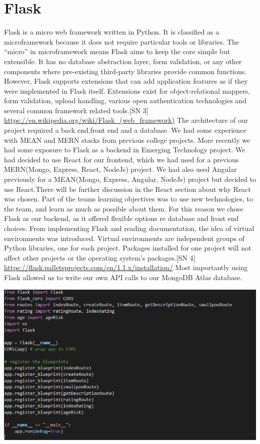\section{Flask}
Flask is a micro web framework written in Python. It is classified as a microframework because it does not require particular tools or libraries. The “micro” in microframework means Flask aims to keep the core simple but extensible. It has no database abstraction layer, form validation, or any other components where pre-existing third-party libraries provide common functions. However, Flask supports extensions that can add application features as if they were implemented in Flask itself. Extensions exist for object-relational mappers, form validation, upload handling, various open authentication technologies and several common framework related tools.[SN 3] \url{https://en.wikipedia.org/wiki/Flask_(web_framework)}
The architecture of our project required a back end,front end and a database. We had some experience with MEAN and MERN stacks from previous college projects. More recently we had some exposure to Flask as a backend in Emerging Technology project. We had decided to use React for our frontend, which we had used for a previous MERN(Mongo, Express, React, NodeJs) project. We had also used Angular previously for a MEAN(Mongo, Express, Angular, NodeJs) project but decided to use React.There will be further discussion in the React section about why React was chosen. Part of the teams learning objectives was to use new technologies, to the team, and learn as much as possible about them. For this reason we chose Flask as our backend, as it offered flexible options re database and front end choices. From implementing Flask and reading documentation, the idea of virtual environments was introduced. Virtual environments are independent groups of Python libraries, one for each project. Packages installed for one project will not affect other projects or the operating system’s packages.[SN 4] \url{https://flask.palletsprojects.com/en/1.1.x/installation/}
Most importantly using Flask allowed us to write our own API calls to our MongoDB Atlas database.

\begin{center}    
      \includegraphics[scale=0.7]{img/flask.PNG}
\end{center}

